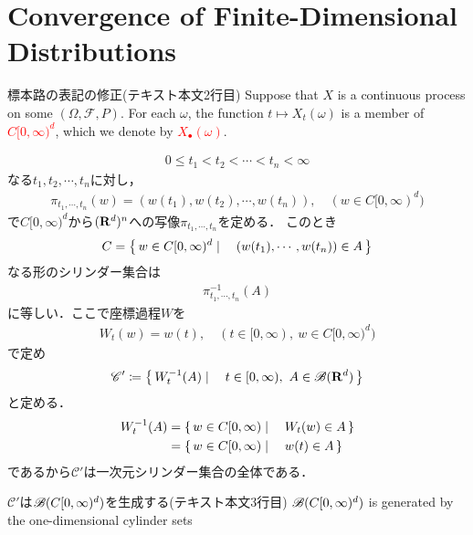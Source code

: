 \section{Convergence of Finite-Dimensional Distributions}
	\begin{itembox}[l]{標本路の表記の修正(テキスト本文2行目)}
		Suppose that $X$ is a continuous process on some $(\Omega,\mathscr{F},P)$.
		For each $\omega$, the function $t \longmapsto X_t(\omega)$ is a member of
		\textcolor{red}{$C[0,\infty)^d$}, which we denote by \textcolor{red}{$X_\bullet(\omega)$}.
	\end{itembox}
	
	\begin{align}
		0 \leq t_1 < t_2 < \cdots < t_n < \infty
	\end{align}
	なる$t_1,t_2,\cdots,t_n$に対し，
	\begin{align}
		\pi_{t_1,\cdots,t_n}(w) = (w(t_1),w(t_2),\cdots,w(t_n)),
		\quad (w \in C[0,\infty)^d)
	\end{align}
	で$C[0,\infty)^d$から$(\mathbf{R}^d)^n$への写像$\pi_{t_1,\cdots,t_n}$を定める．
	このとき
	\begin{align}
		C = \left\{\, w \in C[0,\infty)^d \mid \quad (w(t_1),\cdots,w(t_n)) \in A\, \right\}
	\end{align}
	なる形のシリンダー集合は
	\begin{align}
		\pi_{t_1,\cdots,t_n}^{-1}(A)
	\end{align}
	に等しい．ここで座標過程$W$を
	\begin{align}
		W_t(w) = w(t),\quad (t \in [0,\infty),\ w \in C[0,\infty)^d)
	\end{align}
	で定め
	\begin{align}
		\mathscr{C}' \coloneqq \left\{\, W_t^{-1}(A) \mid \quad t \in [0,\infty),\ A \in \mathscr{B}(\mathbf{R}^d)\, \right\}
	\end{align}
	と定める．
	\begin{align}
		W_t^{-1}(A) &= \left\{\, w \in C[0,\infty) \mid \quad W_t(w) \in A\, \right\} \\
		&= \left\{\, w \in C[0,\infty) \mid \quad w(t) \in A\, \right\}
	\end{align}
	であるから$\mathscr{C}'$は一次元シリンダー集合の全体である．
	
	\begin{itembox}[l]{$\mathscr{C}'$は$\mathscr{B}(C[0,\infty)^d)$を生成する(テキスト本文3行目)}
		\textcolor{red}{$\mathscr{B}(C[0,\infty)^d)$} is generated by the 
		one-dimensional cylinder sets
	\end{itembox}
	
